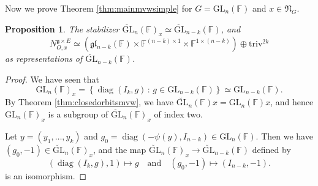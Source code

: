 \documentclass[12pt]{amsart}
\newtheorem{prop}[lm]{Proposition}
\theoremstyle{definition}
\theoremstyle{remark}\newtheorem{rmk}[lm]{Remark}
\newcommand{\GL}{{\mathrm{GL}}}
\newcommand{\triv}{\mathrm{triv}}
\newcommand{\diag}{\operatorname{diag}}
\newcommand{\g}{\mathfrak g}
\newcommand{\gl}{\mathfrak g \mathfrak l}
\newcommand{\fN}{\mathfrak N}
\newcommand{\C}{\mathbb{F}}
\renewcommand{\mid}{\,:\,}
\begin{document}
    Now we prove Theorem \ref{thm:mainmvwsimple} for $G=\GL_n(\C)$ and $x\in\fN_{G}$.
    \begin{prop}
    	\label{prop:descentglnmvw}
    	The stabilizer $\breve{\GL}_n(\C)_x\simeq\breve{\GL}_{n-k}(\C)$, and
    	\begin{equation}
    		\label{eq:descentgln}
    		N_{O,x}^{\g\times E}\simeq(\gl_{n-k}(\C)\times\C^{(n-k)\times 1}\times\C^{1\times(n-k)})\oplus\triv^{2k}
    	\end{equation}
    	as representations of $\breve{\GL}_{n-k}(\C)$.
    \end{prop}
    \begin{proof}
    	We have seen that
    	\begin{equation*}
    		\GL_n(\C)_x=\left\{\diag(I_k,g)\mid g\in\GL_{n-k}(\C)\right\}\simeq\GL_{n-k}(\C).
    	\end{equation*}
    	By Theorem \ref{thm:closedorbitsmvw}, we have $\breve{\GL}_n(\C)x=\GL_{n}(\C)x$, and hence $\GL_n(\C)_x$ is a subgroup of $\breve{\GL}_n(\C)_x$ of index two.
    	
    	Let $y=(y_1,\dots,y_k)$ and $g_0=\diag(-\psi(y),I_{n-k})\in\GL_n(\C)$. Then we have $(g_0,-1)\in\breve{\GL}_n(\C)_x$, and the map $\breve{\GL}_n(\C)_x\to\breve{\GL}_{n-k}(\C)$ defined by
    	\begin{equation*}
    		(\diag(I_k,g),1)\mapsto g\quad\text{and}\quad(g_0,-1)\mapsto(I_{n-k},-1).
    	\end{equation*}
    	is an isomorphism.
    	

\end{proof}
\end{document}
